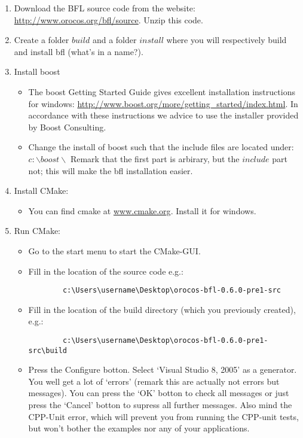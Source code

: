 \documentclass[a4paper,10pt]{article}
\begin{document}
\begin{enumerate}
\item Download the BFL source code from the website: 
\url{http://www.orocos.org/bfl/source}. Unzip this code.
\item Create a folder $build$ and a folder $install$ where you will respectively build and install bfl (what's in a name?).
 \item Install boost
 	\begin{itemize}
 	 \item The boost Getting Started Guide gives excellent installation instructions for windows: \url{http://www.boost.org/more/getting_started/index.html}. In accordance with these instructions we advice to use the installer provided by Boost Consulting.
 	 \item Change the install of boost such that the include files are located under: $ c:\backslash boost \backslash$
 	 Remark that the first part is arbirary, but the $include$ part not; this will make the bfl installation easier.
 	\end{itemize}
\item Install CMake:
	\begin{itemize}
	\item You can find cmake at  \url{www.cmake.org}. Install it for windows.
	\end{itemize}
\item Run CMake:
	\begin{itemize}
	 \item Go to the start menu to start the CMake-GUI.
	 \item Fill in the location of the source code e.g.:
	 	\begin{verbatim}
	 	c:\Users\username\Desktop\orocos-bfl-0.6.0-pre1-src
	 	\end{verbatim}
	\item Fill in the location of the build directory (which you previously created), e.g.:
		\begin{verbatim}
	 	c:\Users\username\Desktop\orocos-bfl-0.6.0-pre1-src\build
		\end{verbatim}
	\item Press the Configure botton. Select `Visual Studio 8, 2005' as a generator.
	 You well get a lot of `errors' (remark this are actually not errors but messages). You can press the `OK' botton to check all messages or just press the `Cancel' botton to supress all further messages. Also mind the CPP-Unit error, which will prevent you from running the CPP-unit tests, but won't bother the examples nor any of your applications.

\end{itemize}
\end{enumerate}
\end{document}
